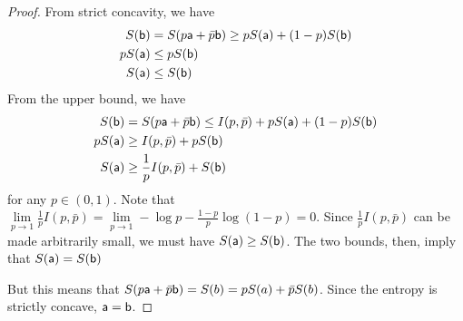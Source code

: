 \begin{proof}
	From strict concavity, we have
	\begin{equation}
		\begin{aligned}
			S(\ens[b]) &= S(p \ens[a] + \bar{p} \ens[b]) \geq p S(\ens[a]) + (1-p) S(\ens[b]) \\
			pS(\ens[a]) &\leq p S(\ens[b]) \\
			S(\ens[a]) &\leq S(\ens[b])
		\end{aligned}
	\end{equation}
	From the upper bound, we have
	\begin{equation}
		\begin{aligned}
			S(\ens[b]) &= S(p \ens[a] + \bar{p} \ens[b]) \leq I(p, \bar{p}) + p S(\ens[a]) + (1-p) S(\ens[b]) \\
			pS(\ens[a]) &\geq  I(p, \bar{p}) + p S(\ens[b]) \\
			S(\ens[a]) &\geq \frac{1}{p} I(p, \bar{p}) + S(\ens[b])
		\end{aligned}
	\end{equation}
	for any $p \in (0,1)$. Note that $\lim\limits_{p \to 1} \frac{1}{p} I(p, \bar{p}) = \lim\limits_{p \to 1}  - \log p - \frac{1-p}{p} \log (1-p) = 0$. Since $\frac{1}{p} I(p, \bar{p})$ can be made arbitrarily small, we must have $S(\ens[a]) \geq S(\ens[b])$. The two bounds, then, imply that $S(\ens[a]) = S(\ens[b])$
	
	But this means that $S(p \ens[a] + \bar{p} \ens[b]) = S(b) = pS(a)+\bar{p}S(b)$. Since the entropy is strictly concave, $\ens[a] = \ens[b]$.
\end{proof}

